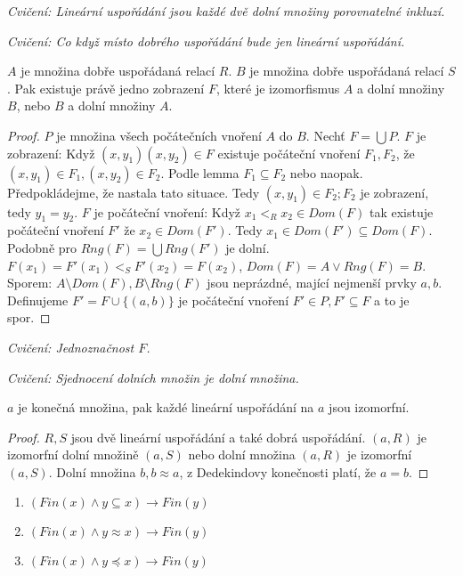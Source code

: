 \textit{Cvičení: Lineární uspořádání jsou každé dvě dolní množiny porovnatelné inkluzí.}

\textit{Cvičení: Co když místo dobrého uspořádání bude jen lineární uspořádání.}

\begin{thm}
	$A$ je množina dobře uspořádaná relací $R$.	$B$ je množina dobře uspořádaná relací $S$. Pak existuje právě jedno zobrazení $F$, které je izomorfismus $A$ a dolní množiny $B$, nebo $B$ a dolní množiny $A$.
\end{thm}

\begin{proof}
	$P$ je množina všech počátečních vnoření $A$ do $B$. Nechť $F = \bigcup P$. $F$ je zobrazení: Když $(x,y_{1})(x,y_{2}) \in F$ existuje počáteční vnoření $F_{1}, F_{2}$, že $(x,y_{1}) \in F_{1}, (x,y_{2}) \in F_{2}$. Podle lemma $F_{1} \subseteq F_{2}$ nebo naopak. Předpokládejme, že nastala tato situace. Tedy $(x,y_{1}) \in F_{2}; F_{2}$ je zobrazení, tedy $y_{1} = y_{2}$. $F$ je počáteční vnoření: Když $x_{1} <_{R} x_{2} \in Dom(F)$ tak existuje počáteční vnoření $F'$ že $x_{2} \in Dom(F')$. Tedy $x_{1} \in Dom(F') \subseteq Dom(F)$. Podobně pro $Rng(F) = \bigcup Rng(F')$ je dolní. $F(x_{1}) = F'(x_{1}) <_{S} F'(x_{2}) = F(x_{2})$, $Dom (F) = A \lor Rng(F) = B$. Sporem: $A \setminus Dom(F), B \setminus Rng(F)$ jsou neprázdné, mající nejmenší prvky $a,b$. Definujeme $F'= F \cup \{(a,b)\}$ je počáteční vnoření $F' \in P, F' \subseteq F$ a to je spor.
\end{proof}

\textit{Cvičení: Jednoznačnost $F$.}

\textit{Cvičení: Sjednocení dolních množin je dolní množina.}

\begin{thm}
	$a$ je konečná množina, pak každé lineární uspořádání na $a$ jsou izomorfní.
\end{thm}

\begin{proof}
	$R,S$ jsou dvě lineární uspořádání a také dobrá uspořádání. $(a,R)$ je izomorfní dolní množině $(a,S)$ nebo dolní množina $(a,R)$ je izomorfní $(a,S)$. Dolní množina $b, b \approx a$, z Dedekindovy konečnosti platí, že $a = b$.
\end{proof}

\begin{lemma}
	\begin{enumerate}
		\item $(Fin(x) \land y \subseteq x) \rightarrow Fin(y)$
		\item $(Fin(x) \land y \approx x) \rightarrow Fin(y)$
		\item $(Fin(x) \land y \preceq x) \rightarrow Fin(y)$
	\end{enumerate}
\end{lemma}

